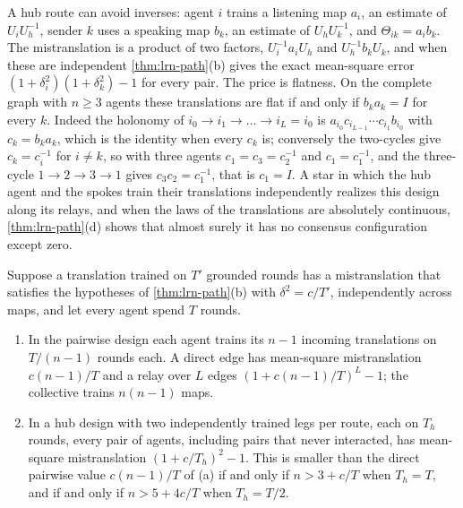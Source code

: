 \begin{remark}\label{rem:lrn-two-maps}
A hub route can avoid inverses: agent $i$ trains a listening map $a_i$, an estimate of $U_iU_h^{-1}$, sender $k$ uses a speaking map $b_k$, an estimate of $U_hU_k^{-1}$, and $\Theta_{ik}=a_ib_k$. The mistranslation is a product of two factors, $U_i^{-1}a_iU_h$ and $U_h^{-1}b_kU_k$, and when these are independent \cref{thm:lrn-path}(b) gives the exact mean-square error $(1+\delta_i^2)(1+\delta_k^2)-1$ for every pair. The price is flatness. On the complete graph with $n\ge3$ agents these translations are flat if and only if $b_ka_k=I$ for every $k$. Indeed the holonomy of $i_0\to i_1\to\dots\to i_L=i_0$ is $a_{i_0}c_{i_{L-1}}\cdots c_{i_1}b_{i_0}$ with $c_k=b_ka_k$, which is the identity when every $c_k$ is; conversely the two-cycles give $c_k=c_i^{-1}$ for $i\ne k$, so with three agents $c_1=c_3=c_2^{-1}$ and $c_1=c_1^{-1}$, and the three-cycle $1\to2\to3\to1$ gives $c_3c_2=c_1^{-1}$, that is $c_1=I$. A star in which the hub agent and the spokes train their translations independently realizes this design along its relays, and when the laws of the translations are absolutely continuous, \cref{thm:lrn-path}(d) shows that almost surely it has no consensus configuration except zero.
\end{remark}

\begin{corollary}\label{cor:lrn-hub-budget}
Suppose a translation trained on $T'$ grounded rounds has a mistranslation that satisfies the hypotheses of \cref{thm:lrn-path}(b) with $\delta^2=c/T'$, independently across maps, and let every agent spend $T$ rounds.
\begin{enumerate}
\item[(a)] In the pairwise design each agent trains its $n-1$ incoming translations on $T/(n-1)$ rounds each. A direct edge has mean-square mistranslation $c(n-1)/T$ and a relay over $L$ edges $(1+c(n-1)/T)^L-1$; the collective trains $n(n-1)$ maps.
\item[(b)] In a hub design with two independently trained legs per route, each on $T_h$ rounds, every pair of agents, including pairs that never interacted, has mean-square mistranslation $(1+c/T_h)^2-1$. This is smaller than the direct pairwise value $c(n-1)/T$ of (a) if and only if $n>3+c/T$ when $T_h=T$, and if and only if $n>5+4c/T$ when $T_h=T/2$.
\end{enumerate}
\end{corollary}

